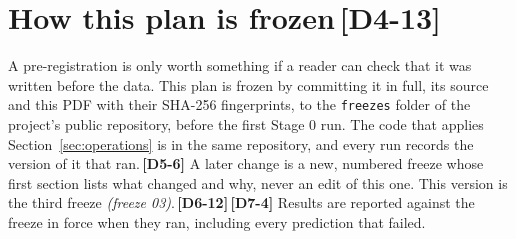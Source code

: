 \documentclass[11pt]{article}
\newcommand{\gl}[1]{{\color{soft}\itshape\small (#1)}}
\newcommand{\chgold}[1]{\,{\color{oldcol}\bfseries\footnotesize[#1]}}
\begin{document}
\section[How this plan is frozen]{How this plan is frozen\protect\chgold{D4-13}}\label{sec:freeze}
A pre-registration is only worth something if a reader can check that it was written before the data. This plan is frozen by committing it in full, its source and this PDF with their SHA-256 fingerprints, to the \texttt{freezes} folder of the project's public repository, before the first Stage 0 run. The code that applies Section~\ref{sec:operations} is in the same repository, and every run records the version of it that ran.\chgold{D5-6} A later change is a new, numbered freeze whose first section lists what changed and why, never an edit of this one. This version is the third freeze \gl{freeze 03}.\chgold{D6-12}\chgold{D7-4} Results are reported against the freeze in force when they ran, including every prediction that failed.
\end{document}

